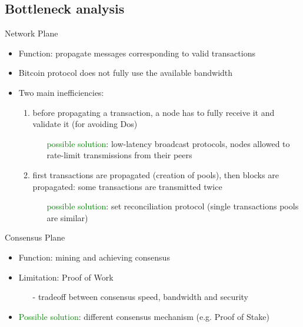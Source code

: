 \documentclass{beamer}
\begin{document}
  \subsection{Bottleneck analysis}
  \begin{frame}{Network Plane}
      \begin{itemize}
          \item Function: propagate messages corresponding to valid transactions
          \item Bitcoin protocol does not fully use the available bandwidth
          \item Two main inefficiencies: 
          \begin{enumerate}
              \item before propagating a transaction, a node has to fully receive it and validate it (for avoiding Dos)
              \begin{itemize}
                  \item[\MVRightarrow] \textcolor{green}{possible solution}: low-latency broadcast protocols, nodes allowed to rate-limit transmissions from their peers
              \end{itemize}
              \pause
              \item first transactions are propagated (creation of pools), then blocks are propagated: some transactions are transmitted twice
              \begin{itemize}
                  \item[\MVRightarrow] \textcolor{green}{possible solution}: set reconciliation protocol (single transactions pools are similar) 
              \end{itemize}
          \end{enumerate}
      \end{itemize}
  \end{frame}
  
  
  
  \begin{frame}{Consensus Plane}
      \begin{itemize}
          \item Function: mining and achieving consensus
          \item Limitation: Proof of Work 
          \begin{itemize}
              \item[-] tradeoff between consensus speed, bandwidth and security
          \end{itemize}
          \item \textcolor{green}{Possible solution}: different consensus mechanism (e.g. Proof of Stake) 
      \end{itemize}
  \end{frame}
  
\end{document}
